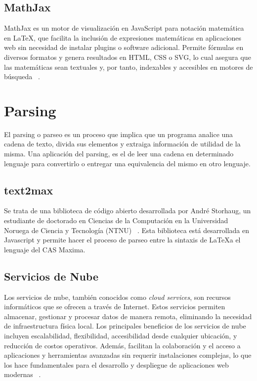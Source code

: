 \subsection{MathJax}
MathJax es un motor de visualización en JavaScript para notación matemática en LaTeX, que facilita la inclusión de expresiones matemáticas en aplicaciones web sin necesidad de instalar plugins o software adicional. Permite fórmulas en diversos formatos y genera resultados en HTML, CSS o SVG, lo cual asegura que las matemáticas sean textuales y, por tanto, indexables y accesibles en motores de búsqueda ~\cite{mathjax}.

\section{Parsing}
El parsing o parseo es un proceso que implica que un programa analice una cadena de texto, divida sus elementos y extraiga información de utilidad de la misma. Una aplicación del parsing, es el de leer una cadena en determinado lenguaje para convertirlo o entregar una equivalencia del mismo en otro lenguaje.

\subsection{text2max}
Se trata de una biblioteca de código abierto desarrollada por André Storhaug, un estudiante de doctorado en Ciencias de la Computación en la Universidad Noruega de Ciencia y Tecnología (NTNU) ~\cite{Parser-tex2maxima}. Esta biblioteca está desarrollada en Javascript y permite hacer el proceso de parseo entre la sintaxis de \LaTeX a el lenguaje del CAS Maxima.

\subsection{Servicios de Nube}
Los servicios de nube, también conocidos como \textit{cloud services}, son recursos informáticos que se ofrecen a través de Internet. Estos servicios permiten almacenar, gestionar y procesar datos de manera remota, eliminando la necesidad de infraestructura física local. Los principales beneficios de los servicios de nube incluyen escalabilidad, flexibilidad, accesibilidad desde cualquier ubicación, y reducción de costos operativos. Además, facilitan la colaboración y el acceso a aplicaciones y herramientas avanzadas sin requerir instalaciones complejas, lo que los hace fundamentales para el desarrollo y despliegue de aplicaciones web modernas ~\cite{microsoft_azure}.

